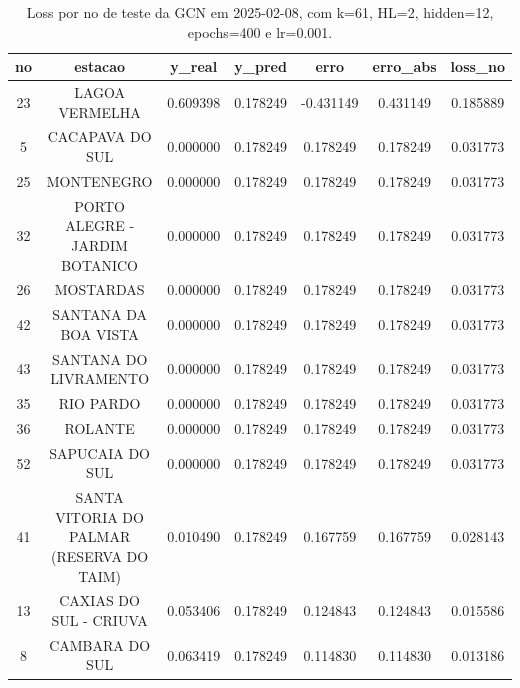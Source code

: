 \begin{table}[h]
\centering
\caption{Loss por no de teste da GCN em 2025-02-08, com k=61, HL=2, hidden=12, epochs=400 e lr=0.001.}
\label{tab:gcn_loss_k61_hl2_h12_e400_d20250208}
\begin{tabular}{ccccccc}
\toprule
no & estacao & y\_real & y\_pred & erro & erro\_abs & loss\_no \\
\midrule
23 & LAGOA VERMELHA & 0.609398 & 0.178249 & -0.431149 & 0.431149 & 0.185889 \\
5 & CACAPAVA DO SUL & 0.000000 & 0.178249 & 0.178249 & 0.178249 & 0.031773 \\
25 & MONTENEGRO & 0.000000 & 0.178249 & 0.178249 & 0.178249 & 0.031773 \\
32 & PORTO ALEGRE - JARDIM BOTANICO & 0.000000 & 0.178249 & 0.178249 & 0.178249 & 0.031773 \\
26 & MOSTARDAS & 0.000000 & 0.178249 & 0.178249 & 0.178249 & 0.031773 \\
42 & SANTANA DA BOA VISTA & 0.000000 & 0.178249 & 0.178249 & 0.178249 & 0.031773 \\
43 & SANTANA DO LIVRAMENTO & 0.000000 & 0.178249 & 0.178249 & 0.178249 & 0.031773 \\
35 & RIO PARDO & 0.000000 & 0.178249 & 0.178249 & 0.178249 & 0.031773 \\
36 & ROLANTE & 0.000000 & 0.178249 & 0.178249 & 0.178249 & 0.031773 \\
52 & SAPUCAIA DO SUL & 0.000000 & 0.178249 & 0.178249 & 0.178249 & 0.031773 \\
41 & SANTA VITORIA DO PALMAR (RESERVA DO TAIM) & 0.010490 & 0.178249 & 0.167759 & 0.167759 & 0.028143 \\
13 & CAXIAS DO SUL - CRIUVA & 0.053406 & 0.178249 & 0.124843 & 0.124843 & 0.015586 \\
8 & CAMBARA DO SUL & 0.063419 & 0.178249 & 0.114830 & 0.114830 & 0.013186 \\
\bottomrule
\end{tabular}
\end{table}
